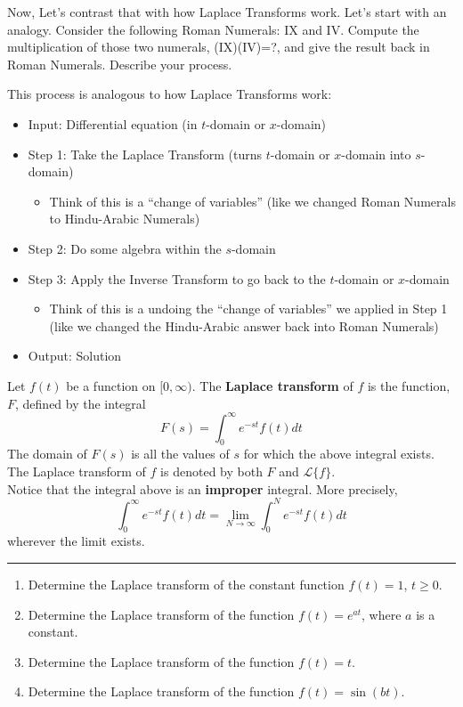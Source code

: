 Now, Let's contrast that with how Laplace Transforms work. Let's start with an analogy. Consider the following Roman Numerals: IX and IV. Compute the multiplication of those two numerals, (IX)(IV)=?, and give the result back in Roman Numerals. Describe your process. \\
\vspace{.8in}

This process is analogous to how Laplace Transforms work:
\begin{itemize} \itemsep-2pt
\item Input: Differential equation (in $t$-domain or $x$-domain)
\item Step 1: Take the Laplace Transform (turns $t$-domain or $x$-domain into $s$-domain)
\begin{itemize} \itemsep-2pt
\item Think of this is a ``change of variables'' (like we changed Roman Numerals to Hindu-Arabic Numerals)
\end{itemize}
\item Step 2: Do some algebra within the $s$-domain
\item Step 3: Apply the Inverse Transform to go back to the $t$-domain or $x$-domain
\begin{itemize} \itemsep-2pt
\item Think of this is a undoing the ``change of variables'' we applied in Step 1 (like we changed the Hindu-Arabic answer back into Roman Numerals)
\end{itemize}
\item Output: Solution
\end{itemize}

\newpage
{}

Let $f(t)$ be a function on $[0,\infty)$. The \textbf{Laplace transform} of $f$ is the function, $F$, defined by the integral
\[
F(s)=\int_0^\infty e^{-st}f(t)dt
\]
The domain of $F(s)$ is all the values of $s$ for which the above integral exists. The Laplace transform of $f$ is denoted by both $F$ and $\mathscr{L}\{f\}$. \\

Notice that the integral above is an \textbf{improper} integral. More precisely,
\[
\int_0^\infty e^{-st}f(t)dt=\lim_{N\to\infty} \int_0^N e^{-st}f(t)dt
\]
wherever the limit exists. \\
\hrule
\vspace{6pt}
\begin{enumerate}
\item Determine the Laplace transform of the constant function $f(t)=1$, $t \geq 0$. \label{15problem1}
\vfill
\item Determine the Laplace transform of the function $f(t)=e^{at}$, where $a$ is a constant. \label{15problem2}
\vfill
\newpage
\item Determine the Laplace transform of the function $f(t)=t$. \label{15problem3}
\vfill
\item Determine the Laplace transform of the function $f(t)=\sin(bt)$. \label{15problem4}
\vfill
\end{enumerate}

